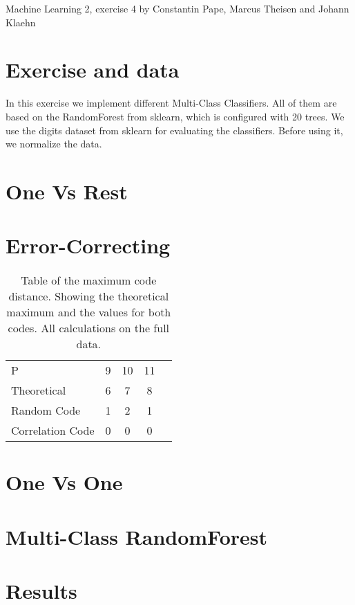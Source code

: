 \documentclass{article}
\begin{document}
Machine Learning 2, exercise 4 by Constantin Pape, Marcus Theisen and Johann Klaehn
 
\section{Exercise and data}

In this exercise we implement different Multi-Class Classifiers.
All of them are based on the RandomForest from sklearn, which is configured with 20 trees.
We use the digits dataset from sklearn for evaluating the classifiers.
Before using it, we normalize the data.

\section{One Vs Rest}

\section{Error-Correcting}

\begin{table}[h]
	\centering
	\begin{tabular}{l c c c c}
        P	            &	9	& 10    &   11   \\
        Theoretical	    &	6	&  7    &    8   \\
        Random Code     &   1   &  2    &    1   \\
        Correlation Code&   0   &  0    &    0   \\ 
	\end{tabular}
	\caption{Table of the maximum code distance. Showing the theoretical maximum and the values for both codes. All calculations on the full data.}
	\label{tab1}
\end{table}

\section{One Vs One}

\section{Multi-Class RandomForest}

\section{Results}

\end{document}
